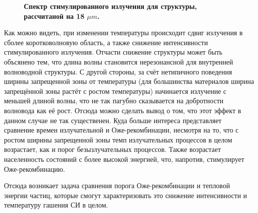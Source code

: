 \documentclass[../main.tex]{subfiles}
\begin{document}
\begin{figure}[h]
\begin{minipage}[h]{\linewidth}
\begin{center}
                \vspace{0.75cm}
                \textbf{Спектр стимулированного излучения для структуры, 
                    рассчитаной на 18 $\mu m$.}
                \vspace{0.75cm}
            \end{center}
        \end{minipage}
    \end{figure}

    Как можно видеть, при изменении температуры происходит сдвиг излучения в сболее коротковолновую область, а также снижение 
    интенсивности стимулированного излучения. Отчасти снижение структуры может быть объсянено тем, что длина волны становится 
    нерезонансной для внутренней волноводной структуры. С другой стороны, за счёт нетипичного поведения ширины запрещенной 
    зоны от температуры (для большинства материалов ширина запрещённой зоны растёт с ростом температуры) начинается излучение
    с меньшей длиной волны, что не так пагубно сказывается на добротности волновода как её рост. Отсюда можно сделать вывод о том, 
    что этот эффект в данном случае не так существенен. Куда больше интереса представляет сравнение времен излучательной и 
    Оже-рекомбинации, несмотря на то, что с ростом ширины запрещенной зоны темп излучательных процессов в целом возрастает, 
    как и порог безызлучательных процессов. Также возрастает населенность состояний с более высокой энергией, что, напротив,
    стимулирует Оже-рекомбинацию.

    Отсюда возникает задача сравнения порога Оже-рекомбинации и тепловой энергии частиц, которые смогут характеризовать это 
    снижение интенсивности и температуру гашения СИ в целом.
\end{document}

